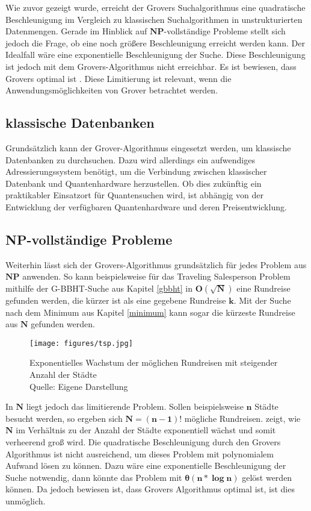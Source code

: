 Wie zuvor gezeigt wurde, erreicht der Grovers Suchalgorithmus eine quadratische Beschleunigung im Vergleich zu klassischen Suchalgorithmen in unstrukturierten Datenmengen. 
Gerade im Hinblick auf $\mathbf{NP}$-vollständige Probleme stellt sich jedoch die Frage, ob eine noch größere Beschleunigung erreicht werden kann. Der Idealfall wäre eine exponentielle Beschleunigung der Suche. 
Diese Beschleunigung ist jedoch mit dem Grovers-Algorithmus nicht erreichbar. 
Es ist bewiesen, dass Grovers optimal ist \cite[S. 161-166]{Ho17}. 
Diese Limitierung ist relevant, wenn die Anwendungsmöglichkeiten von Grover betrachtet werden.
\subsection{klassische Datenbanken}
Grundsätzlich kann der Grover-Algorithmus eingesetzt werden, um klassische Datenbanken zu durchsuchen. 
Dazu wird allerdings ein aufwendiges Adressierungssystem benötigt, um die Verbindung zwischen klassischer Datenbank und Quantenhardware herzustellen. 
Ob dies zukünftig ein praktikabler Einsatzort für Quantensuchen wird, ist abhängig von der Entwicklung der verfügbaren Quantenhardware und deren Preisentwicklung.
\subsection{NP-vollständige Probleme}
Weiterhin lässt sich der Grovers-Algorithmus grundsätzlich für jedes Problem aus $\mathbf{NP}$ anwenden. 
So kann beispielsweise für das Traveling Salesperson Problem mithilfe der G-BBHT-Suche aus Kapitel \ref{gbbht} in $\mathbf{O(\sqrt{N})}$ eine Rundreise gefunden werden, die kürzer ist als eine gegebene Rundreise $\mathbf{k}$. 
Mit der Suche nach dem Minimum aus Kapitel \ref{minimum} kann sogar die kürzeste Rundreise aus $\mathbf{N}$ gefunden werden.

\begin{figure}
	\centering
	\texttt{[image: figures/tsp.jpg]}
	
	\caption{Exponentielles Wachstum der möglichen Rundreisen mit steigender Anzahl der Städte\\Quelle: Eigene Darstellung}
	
	\label{fig:tsp}
\end{figure}

In $\mathbf{N}$ liegt jedoch das limitierende Problem. Sollen beispielsweise $\mathbf{n}$ Städte besucht werden, so ergeben sich $\mathbf{N=(n-1)!}$ mögliche Rundreisen. 
 zeigt, wie $\mathbf{N}$ im Verhältnis zu der Anzahl der Städte exponentiell wächst und somit verheerend groß wird. 
Die quadratische Beschleunigung durch den Grovers Algorithmus ist nicht ausreichend, um dieses Problem mit polynomialem Aufwand lösen zu können. 
Dazu wäre eine exponentielle Beschleunigung der Suche notwendig, dann könnte das Problem mit $\mathbf{\theta (n * \log n)}$ gelöst werden können. 
Da jedoch bewiesen ist, dass Grovers Algorithmus optimal ist, ist dies unmöglich.

